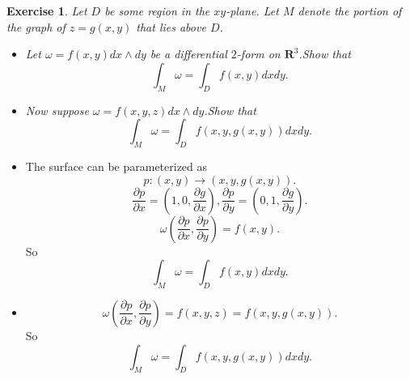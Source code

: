 \documentclass[a4paper]{article}
\newtheorem*{exe}{Exercise}
\newenvironment{exercise}
{\bigskip\begin{mdframed}\begin{exe}}
    {\end{exe}\end{mdframed}\bigskip}
\newcommand{\pa}{\partial} \newcommand{\Om}{\Omega}
\begin{document}
\begin{exercise}
Let $D$ be some region in the $xy$-plane. Let $M$ denote the portion of the
graph of $z = g(x, y)$ that lies above $D$.
\begin{itemize}
\item Let $\omega=f(x,y)dx\wedge dy$ be a differential $2$-form on
  $\mathbf{R}^3$.Show that 
$$
\int_M\omega=\int_Df(x,y)dxdy.
$$ 
\item Now suppose $\omega =f(x,y,z)dx\wedge dy$.Show that 
$$
\int_M\omega=\int_Df(x,y,g(x,y))dxdy.
$$
\end{itemize}
\end{exercise}
\begin{itemize}
\item The surface can be parameterized as
$$
p:(x,y)\to (x,y,g(x,y)).
$$
$$
\frac{\pa p}{\pa x}=\left(1,0,\frac{\pa g}{\pa x}\right),\frac{\pa p}{\pa
  y}=\left(0,1,\frac{\pa g}{\pa y}\right).
$$
$$
\omega\left(\frac{\pa p}{\pa x},\frac{\pa p}{\pa y}\right)=f(x,y).
$$
So 
$$
\int_M\omega=\int_Df(x,y)dxdy.
$$
\item 
$$
\omega \left(\frac{\pa p}{\pa x},\frac{\pa p}{\pa y}\right)=f(x,y,z)=f(x,y,g(x,y)).
$$
So
$$
\int_M\omega=\int_Df(x,y,g(x,y))dxdy.
$$
\end{itemize}
\end{document}

